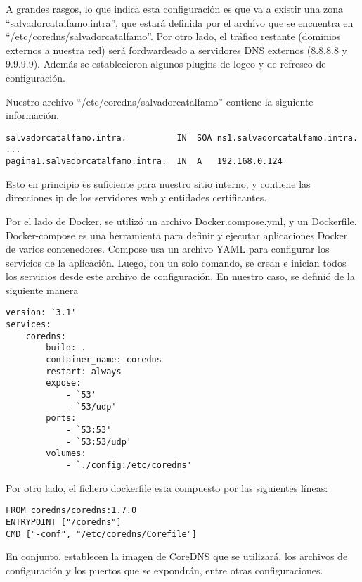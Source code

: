 A grandes rasgos, lo que indica esta configuración es que va a existir una zona 
“salvadorcatalfamo.intra”, que estará definida por el archivo que se encuentra en 
“/etc/coredns/salvadorcatalfamo”. Por otro lado, el tráfico restante (dominios externos a nuestra red)
será fordwardeado a 
servidores DNS externos (8.8.8.8 y 9.9.9.9). Además se establecieron algunos plugins de logeo y 
de refresco de configuración.

Nuestro archivo “/etc/coredns/salvadorcatalfamo” contiene la siguiente información.
\begin{verbatim}
salvadorcatalfamo.intra.          IN  SOA ns1.salvadorcatalfamo.intra. ...
pagina1.salvadorcatalfamo.intra.  IN  A   192.168.0.124   
\end{verbatim}

Esto en principio es suficiente para nuestro sitio interno, y contiene las direcciones ip de los 
servidores web y entidades certificantes.

Por el lado de Docker, se utilizó un archivo Docker.compose.yml, y un Dockerfile. 
Docker-compose es una herramienta para definir y ejecutar aplicaciones Docker de 
varios contenedores. Compose usa un archivo YAML para configurar los servicios de 
la aplicación. Luego, con un solo comando, se crean e inician todos los servicios 
desde este archivo de configuración. En nuestro caso, se definió de la siguiente 
manera

\begin{verbatim}
version: `3.1'
services:
    coredns:
        build: .
        container_name: coredns
        restart: always
        expose:
            - `53'
            - `53/udp'
        ports:
            - `53:53'
            - `53:53/udp'
        volumes:
            - `./config:/etc/coredns'    
\end{verbatim}

\noindent Por otro lado, el fichero dockerfile esta compuesto por las siguientes líneas:
\begin{verbatim}
FROM coredns/coredns:1.7.0
ENTRYPOINT ["/coredns"]
CMD ["-conf", "/etc/coredns/Corefile"]    
\end{verbatim}

En conjunto, establecen la imagen de CoreDNS que se utilizará, los archivos de configuración y
los puertos que se expondrán, entre otras configuraciones.

